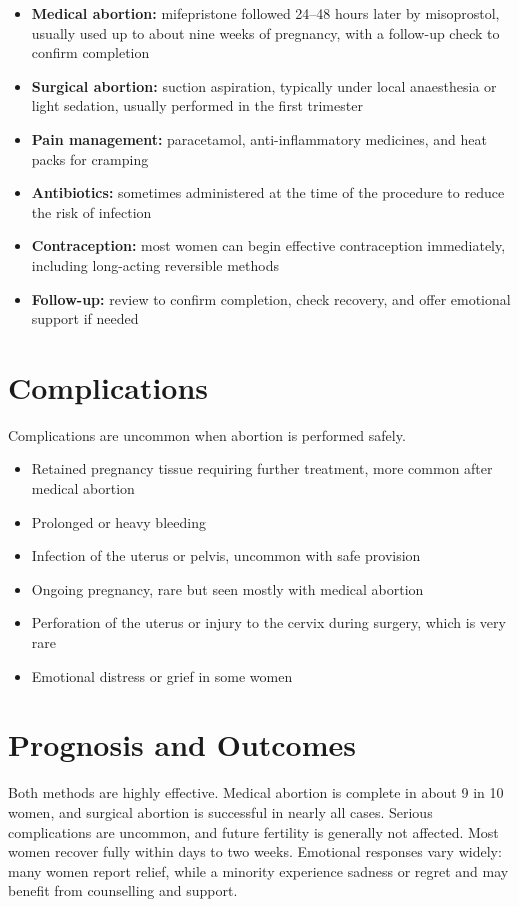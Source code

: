 \begin{itemize}
    \item \textbf{Medical abortion:} mifepristone followed 24--48 hours later by misoprostol, usually used up to about nine weeks of pregnancy, with a follow-up check to confirm completion
    \item \textbf{Surgical abortion:} suction aspiration, typically under local anaesthesia or light sedation, usually performed in the first trimester
    \item \textbf{Pain management:} paracetamol, anti-inflammatory medicines, and heat packs for cramping
    \item \textbf{Antibiotics:} sometimes administered at the time of the procedure to reduce the risk of infection
    \item \textbf{Contraception:} most women can begin effective contraception immediately, including long-acting reversible methods
    \item \textbf{Follow-up:} review to confirm completion, check recovery, and offer emotional support if needed
\end{itemize}

\section*{Complications}
Complications are uncommon when abortion is performed safely.

\begin{itemize}
    \item Retained pregnancy tissue requiring further treatment, more common after medical abortion
    \item Prolonged or heavy bleeding
    \item Infection of the uterus or pelvis, uncommon with safe provision
    \item Ongoing pregnancy, rare but seen mostly with medical abortion
    \item Perforation of the uterus or injury to the cervix during surgery, which is very rare
    \item Emotional distress or grief in some women
\end{itemize}

\section*{Prognosis and Outcomes}
Both methods are highly effective. Medical abortion is complete in about 9 in 10 women, and surgical abortion is successful in nearly all cases. Serious complications are uncommon, and future fertility is generally not affected. Most women recover fully within days to two weeks. Emotional responses vary widely: many women report relief, while a minority experience sadness or regret and may benefit from counselling and support.

